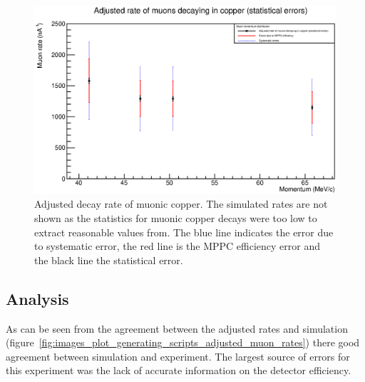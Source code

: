\begin{figure}[hptb]
  \centering
    \includegraphics[width=\textwidth]{images/plot_generating_scripts/adjusted_muon_rates_cu.eps}
  \caption{Adjusted decay rate of muonic copper. The simulated rates are not shown as the statistics for muonic copper decays were too low to extract reasonable values from. The blue line indicates the error due to systematic error, the red line is the MPPC efficiency error and the black line the statistical error.}
  \label{fig:images_plot_generating_scripts_adjusted_muon_rates_cu}
\end{figure}

\subsection{Analysis} %
\label{sub:mom_analysis}
As can be seen from the agreement between the adjusted rates and simulation (figure~\ref{fig:images_plot_generating_scripts_adjusted_muon_rates}) there good agreement between simulation and experiment. The largest source of errors for this experiment was the lack of accurate information on the detector efficiency. 
